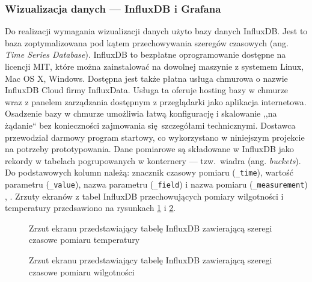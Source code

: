\documentclass[a4paper, 12pt, twoside]{article}
\begin{document}
\subsubsection{Wizualizacja danych --- InfluxDB i Grafana}

Do realizacji wymagania wizualizacji danych użyto bazy danych InfluxDB.
Jest to baza zoptymalizowana pod kątem przechowywania szeregów czasowych
(ang. \emph{Time Series Database}). InfluxDB to bezpłatne
oprogramowanie dostępne na licencji MIT, które można zainstalować na dowolnej
maszynie z systemem Linux, Mac OS X, Windows. Dostępna jest także
płatna usługa chmurowa o nazwie InfluxDB Cloud firmy InfluxData. Usługa ta oferuje hosting
bazy w chmurze wraz z panelem zarządzania dostępnym z przeglądarki jako
aplikacja internetowa. Osadzenie bazy w chmurze umożliwia łatwą konfigurację
i skalowanie ,,na żądanie`` bez konieczności zajmowania się szczegółami technicznymi.
Dostawca przewodział darmowy program startowy, co wykorzystano w niniejszym projekcie
na potrzeby prototypowania. Dane pomiarowe są składowane w InfluxDB
jako rekordy w tabelach pogrupowanych w konternery --- tzw.~wiadra (ang. \emph{buckets}).
Do podstawowych kolumn należą: znacznik czasowy pomiaru (\texttt{\_time}),
wartość parametru (\texttt{\_value}), nazwa parametru (\texttt{\_field}) i nazwa pomiaru (\texttt{\_measurement})
\cite{influx-db-cloud}, \cite{influx-db}.
Zrzuty ekranów z tabel InfluxDB przechowujących pomiary wilgotności i temperatury
przedsawiono na rysunkach \ref{fig:influx_1} i \ref{fig:influx_2}.

\begin{figure}[h]
      \centering
      \caption{Zrzut ekranu przedstawiający tabelę InfluxDB zawierającą szeregi czasowe pomiaru temperatury}
      \label{fig:influx_1}
\end{figure}

\begin{figure}[h]
      \centering
      \caption{Zrzut ekranu przedstawiający tabelę InfluxDB zawierającą szeregi czasowe pomiaru wilgotności}
      \label{fig:influx_2}
\end{figure}
\end{document}
